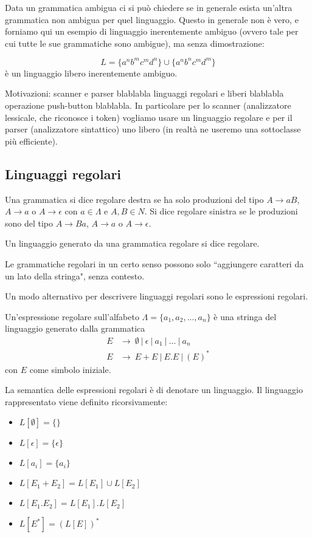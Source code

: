 \documentclass[12pt]{article}
\numberwithin{theorem}{subsection}
\begin{document}
Data un grammatica ambigua ci si può chiedere se in generale esista un'altra grammatica non ambigua per quel linguaggio. Questo in generale non è vero, e forniamo qui un esempio di linguaggio inerentemente ambiguo (ovvero tale per cui tutte le sue grammatiche sono ambigue), ma senza dimostrazione:
\begin{example}
	\[ L = \lbrace a^n b^m c^m d^n \rbrace \cup \lbrace a^n b^n c^m d^m \rbrace \]
	è un linguaggio libero inerentemente ambiguo.
\end{example}

Motivazioni: scanner e parser blablabla linguaggi regolari e liberi blablabla operazione push-button blablabla.
In particolare per lo scanner (analizzatore lessicale, che riconosce i token) vogliamo usare un linguaggio regolare e per il parser (analizzatore sintattico) uno libero (in realtà ne useremo una sottoclasse più efficiente).

\newpage
\subsection{Linguaggi regolari}
\begin{definition}
	Una grammatica si dice regolare destra se ha solo produzioni del tipo  $A \rightarrow aB$, $A \rightarrow a$ o $A \rightarrow \epsilon$ con $a \in \Lambda$ e $A, B \in N$. Si dice regolare sinistra se le produzioni sono del tipo $A \rightarrow Ba$, $A \rightarrow a$ o $A \rightarrow \epsilon$.
	
	Un linguaggio generato da una grammatica regolare si dice regolare.
\end{definition}
Le grammatiche regolari in un certo senso possono solo ``aggiungere caratteri da un lato della stringa", senza contesto.

Un modo alternativo per descrivere linguaggi regolari sono le espressioni regolari.
\begin{definition}
	Un'espressione regolare sull'alfabeto $\Lambda = \{ a_1, a_2, ..., a_n \}$ è una stringa del linguaggio generato dalla grammatica
	\begin{align*}
	E &\rightarrow \ \emptyset \ \vert \ \epsilon\ \vert \ a_1 \ \vert \ ... \ \vert \ a_n \\
	E &\rightarrow \ E + E \ \vert \ E . E \ \vert \ (E)^*
	\end{align*}
	con $E$ come simbolo iniziale.
\end{definition}

La semantica delle espressioni regolari è di denotare un linguaggio. Il linguaggio rappresentato viene definito ricorsivamente:
\begin{itemize}
	\item $L[\emptyset] = \{ \}$
	\item $L[\epsilon] = \{ \epsilon \}$
	\item $L[a_i] = \{ a_i \}$
	\item $L[E_1 + E_2] = L[E_1] \cup L[E_2]$
	\item $L[E_1 . E_2] = L[E_1] . L[E_2]$
	\item $L[E^*] = (L[E])^*$
\end{itemize}
\end{document}
